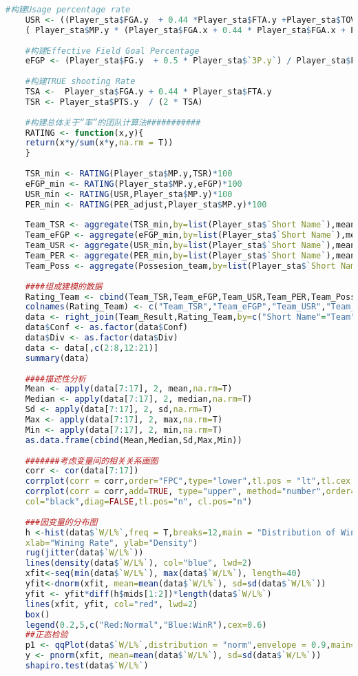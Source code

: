 \begin{lstlisting}[language=R,caption=My code]
	#构建Usage percentage rate
	USR <- ((Player_sta$FGA.y  + 0.44 *Player_sta$FTA.y +Player_sta$TOV.y) * (Player_sta$MP.x / 5)) / 
	( Player_sta$MP.y * (Player_sta$FGA.x + 0.44 * Player_sta$FGA.x + Player_sta$TOV.y))
	
	#构建Effective Field Goal Percentage
	eFGP <- (Player_sta$FG.y  + 0.5 * Player_sta$`3P.y`) / Player_sta$FGA
	
	#构建TRUE shooting Rate
	TSA <-  Player_sta$FGA.y + 0.44 * Player_sta$FTA.y
	TSR <- Player_sta$PTS.y  / (2 * TSA)
	
	#构建总体关于“率”的团队计算法###########
	RATING <- function(x,y){
	return(x*y/sum(x*y,na.rm = T))
	}
	
	TSR_min <- RATING(Player_sta$MP.y,TSR)*100
	eFGP_min <- RATING(Player_sta$MP.y,eFGP)*100
	USR_min <- RATING(USR,Player_sta$MP.y)*100
	PER_min <- RATING(PER_adjust,Player_sta$MP.y)*100
	
	Team_TSR <- aggregate(TSR_min,by=list(Player_sta$`Short Name`),mean,na.rm=T)$'x'
	Team_eFGP <- aggregate(eFGP_min,by=list(Player_sta$`Short Name`),mean,na.rm=T)$'x'
	Team_USR <- aggregate(USR_min,by=list(Player_sta$`Short Name`),mean,na.rm=T)$'x'
	Team_PER <- aggregate(PER_min,by=list(Player_sta$`Short Name`),mean,na.rm=T)$'x'
	Team_Poss <- aggregate(Possesion_team,by=list(Player_sta$`Short Name`),mean,na.rm=T)
	
	####组成建模的数据
	Rating_Team <- cbind(Team_TSR,Team_eFGP,Team_USR,Team_PER,Team_Poss)
	colnames(Rating_Team) <- c("Team_TSR","Team_eFGP","Team_USR","Team_PER","Team","Team_Poss")
	data <- right_join(Team_Result,Rating_Team,by=c("Short Name"="Team"))
	data$Conf <- as.factor(data$Conf)
	data$Div <- as.factor(data$Div)
	data <- data[,c(2:8,12:21)]
	summary(data)
	
	####描述性分析
	Mean <- apply(data[7:17], 2, mean,na.rm=T)
	Median <- apply(data[7:17], 2, median,na.rm=T)
	Sd <- apply(data[7:17], 2, sd,na.rm=T)
	Max <- apply(data[7:17], 2, max,na.rm=T)
	Min <- apply(data[7:17], 2, min,na.rm=T)
	as.data.frame(cbind(Mean,Median,Sd,Max,Min))
	
	#######考虑变量间的相关关系画图
	corr <- cor(data[7:17])
	corrplot(corr = corr,order="FPC",type="lower",tl.pos = "lt",tl.cex = 0.6)
	corrplot(corr = corr,add=TRUE, type="upper", method="number",order="FPC", 
	col="black",diag=FALSE,tl.pos="n", cl.pos="n")
	
	###因变量的分布图
	h <-hist(data$`W/L%`,freq = T,breaks=12,main = "Distribution of Wining Ratio",
	xlab="Wining Rate", ylab="Density")
	rug(jitter(data$`W/L%`))
	lines(density(data$`W/L%`), col="blue", lwd=2)
	xfit<-seq(min(data$`W/L%`), max(data$`W/L%`), length=40) 
	yfit<-dnorm(xfit, mean=mean(data$`W/L%`), sd=sd(data$`W/L%`)) 
	yfit <- yfit*diff(h$mids[1:2])*length(data$`W/L%`) 
	lines(xfit, yfit, col="red", lwd=2)
	box() 
	legend(0.2,5,c("Red:Normal","Blue:WinR"),cex=0.6)
	##正态检验
	p1 <- qqPlot(data$`W/L%`,distribution = "norm",envelope = 0.9,main="Normal Test",ylab="WinR")
	y <- pnorm(xfit, mean=mean(data$`W/L%`), sd=sd(data$`W/L%`))
	shapiro.test(data$`W/L%`)
	

\end{lstlisting}
